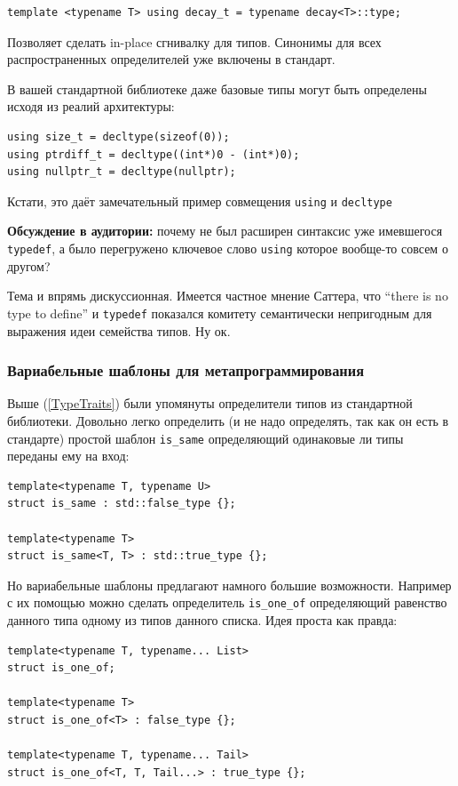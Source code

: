 \documentclass[a4paper,12pt,oneside]{article}
\begin{document}
\begin{lstlisting}
template <typename T> using decay_t = typename decay<T>::type;
\end{lstlisting}

Позволяет сделать in-place сгнивалку для типов. Синонимы для всех распространенных определителей уже включены в стандарт.

В вашей стандартной библиотеке даже базовые типы могут быть определены исходя из реалий архитектуры:

\begin{lstlisting}
using size_t = decltype(sizeof(0));
using ptrdiff_t = decltype((int*)0 - (int*)0);
using nullptr_t = decltype(nullptr);
\end{lstlisting}

Кстати, это даёт замечательный пример совмещения \lstinline!using! и \lstinline!decltype!

\textbf{Обсуждение в аудитории:} почему не был расширен синтаксис уже имевшегося \lstinline!typedef!, а было перегружено ключевое слово \lstinline!using! которое вообще-то совсем о другом?

Тема и впрямь дискуссионная. Имеется частное мнение Саттера, что ``there is no type to define'' и \lstinline!typedef! показался комитету семантически непригодным для выражения идеи семейства типов. Ну ок.

\subsubsection{Вариабельные шаблоны для метапрограммирования}

Выше (\ref{TypeTraits}) были упомянуты определители типов из стандартной библиотеки. Довольно легко определить (и не надо определять, так как он есть в стандарте) простой шаблон \lstinline!is_same! определяющий одинаковые ли типы переданы ему на вход:

\begin{lstlisting}
template<typename T, typename U>
struct is_same : std::false_type {};
 
template<typename T>
struct is_same<T, T> : std::true_type {};
\end{lstlisting}

Но вариабельные шаблоны предлагают намного большие возможности. Например с их помощью можно сделать определитель \lstinline!is_one_of! определяющий равенство данного типа одному из типов данного списка. Идея проста как правда:

\begin{lstlisting}
template<typename T, typename... List>
struct is_one_of;

template<typename T>
struct is_one_of<T> : false_type {};

template<typename T, typename... Tail>
struct is_one_of<T, T, Tail...> : true_type {};
\end{lstlisting}
\end{document}
